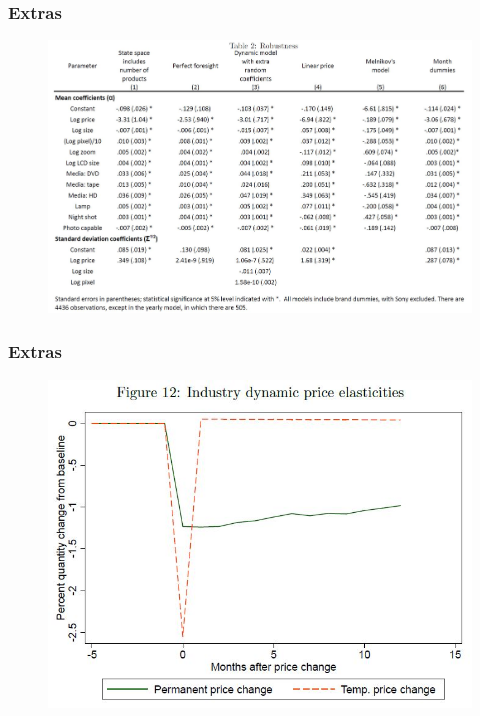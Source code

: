 \documentclass{beamer}
\theoremstyle{definition}
\begin{document}
\begin{frame}
  \frametitle{Extras}

  \begin{figure}
    \includegraphics[width=\linewidth]{Table 2.JPG}
  \end{figure}
\end{frame}

\begin{frame}
  \frametitle{Extras}

  \begin{figure}
    \includegraphics[width=\linewidth]{12.JPG}
  \end{figure}
\end{frame}
\end{document}
